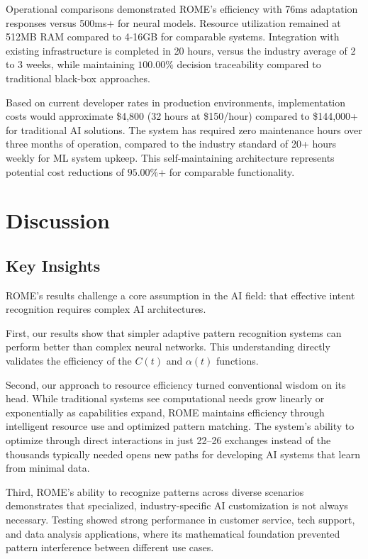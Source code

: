 \documentclass[12pt]{article}
\begin{document}
Operational comparisons demonstrated ROME's efficiency with 76ms adaptation responses versus 500ms+ for neural models. Resource utilization remained at 512MB RAM compared to 4-16GB for comparable systems. Integration with existing infrastructure is completed in 20 hours, versus the industry average of 2 to 3 weeks, while maintaining $100.00\%$ decision traceability compared to traditional black-box approaches.

Based on current developer rates in production environments, implementation costs would approximate \$4,800 (32 hours at \$150/hour) compared to \$144,000+ for traditional AI solutions. The system has required zero maintenance hours over three months of operation, compared to the industry standard of 20+ hours weekly for ML system upkeep. This self-maintaining architecture represents potential cost reductions of $95.00\%$+ for comparable functionality.

\section{Discussion}

\subsection{Key Insights}
ROME's results challenge a core assumption in the AI field: that effective intent recognition requires complex AI architectures.

First, our results show that simpler adaptive pattern recognition systems can perform better than complex neural networks. This understanding directly validates the efficiency of the $C(t)$ and $\alpha(t)$ functions.

Second, our approach to resource efficiency turned conventional wisdom on its head. While traditional systems see computational needs grow linearly or exponentially as capabilities expand, ROME maintains efficiency through intelligent resource use and optimized pattern matching. The system's ability to optimize through direct interactions in just 22--26 exchanges instead of the thousands typically needed opens new paths for developing AI systems that learn from minimal data.

Third, ROME's ability to recognize patterns across diverse scenarios demonstrates that specialized, industry-specific AI customization is not always necessary. Testing showed strong performance in customer service, tech support, and data analysis applications, where its mathematical foundation prevented pattern interference between different use cases.
\end{document}
